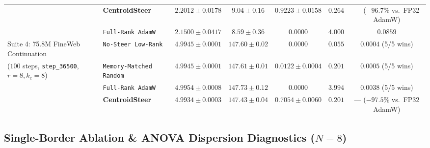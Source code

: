 \documentclass[10pt,twocolumn,letterpaper]{article}
\begin{document}
\begin{table}[t]
{\begin{tabular}{llccccc}
 & \textbf{CentroidSteer} & $\mathbf{2.2012 \pm 0.0178}$ & $\mathbf{9.04 \pm 0.16}$ & $\mathbf{0.9223 \pm 0.0158}$ & $\mathbf{0.264}$ & --- ($-96.7\%$ vs.\ FP32 AdamW) \\
 & \texttt{Full-Rank AdamW} & $2.1500 \pm 0.0417$ & $8.59 \pm 0.36$ & $0.0000$ & $4.000$ & $0.0859$ \\
\midrule
Suite 4: 75.8M FineWeb Continuation & \texttt{No-Steer Low-Rank} & $4.9945 \pm 0.0001$ & $147.60 \pm 0.02$ & $0.0000$ & $0.055$ & $\mathbf{0.0004}$ (5/5 wins) \\
($100$ steps, \texttt{step\_36500}, $r=8, k_c=8$) & \texttt{Memory-Matched Random} & $4.9945 \pm 0.0001$ & $147.61 \pm 0.01$ & $0.0122 \pm 0.0004$ & $0.201$ & $\mathbf{0.0005}$ (5/5 wins) \\
 & \texttt{Full-Rank AdamW} & $4.9954 \pm 0.0008$ & $147.73 \pm 0.12$ & $0.0000$ & $3.994$ & $\mathbf{0.0038}$ (5/5 wins) \\
 & \textbf{CentroidSteer} & $\mathbf{4.9934 \pm 0.0003}$ & $\mathbf{147.43 \pm 0.04}$ & $\mathbf{0.7054 \pm 0.0060}$ & $\mathbf{0.201}$ & --- ($-97.5\%$ vs.\ FP32 AdamW) \\
\bottomrule
\end{tabular}%
}
\end{table}

\subsection{Single-Border Ablation \& ANOVA Dispersion Diagnostics (\texorpdfstring{$N=8$}{N=8})}
\label{sec:steering_ablation}

\begin{table}[t]
\centering
\small
\caption{\textbf{Controlled Routing Steering Ablation on MoE Model ($N=8$ Seeds)} under identical initial weights and sequence ordering, reporting held-out validation performance alongside empirical ANOVA routing geometry from Theorem~\ref{thm:anova_concentration}.}
\label{tab:steering_ablation}
\end{table}
\end{document}
